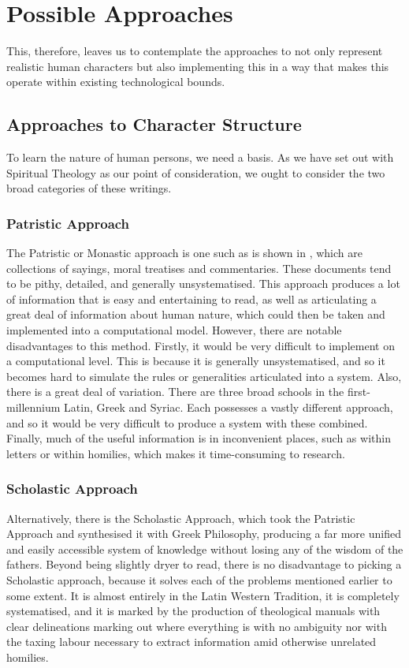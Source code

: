 \documentclass[11pt]{article}
\begin{document}
\section{Possible Approaches}
This, therefore, leaves us to contemplate the approaches to not only represent realistic human characters but also implementing this in a way that makes this operate within existing technological bounds.
\subsection{Approaches to Character Structure}
To learn the nature of human persons, we need a basis. As we have set out with Spiritual Theology as our point of consideration, we ought to consider the two broad categories of these writings.
\subsubsection{Patristic Approach}
The Patristic or Monastic approach is one such as is shown in \cite{1983philokalia}, which are collections of sayings, moral treatises and commentaries. These documents tend to be pithy, detailed, and generally unsystematised. This approach produces a lot of information that is easy and entertaining to read, as well as articulating a great deal of information about human nature, which could then be taken and implemented into a computational model. However, there are notable disadvantages to this method. Firstly, it would be very difficult to implement on a computational level. This is because it is generally unsystematised, and so it becomes hard to simulate the rules or generalities articulated into a system. Also, there is a great deal of variation. There are three broad schools in the first-millennium \: Latin, Greek and Syriac. Each possesses a vastly different approach, and so it would be very difficult to produce a system with these combined. Finally, much of the useful information is in inconvenient places, such as within letters or within homilies, which makes it time-consuming to research.
\subsubsection{Scholastic Approach} 
Alternatively, there is the Scholastic Approach, which took the Patristic Approach and synthesised it with Greek Philosophy, producing a far more unified and easily accessible system of knowledge without losing any of the wisdom of the fathers. Beyond being slightly dryer to read, there is no disadvantage to picking a Scholastic approach, because it solves each of the problems mentioned earlier to some extent. It is almost entirely in the Latin Western Tradition, it is completely systematised, and it is marked by the production of theological manuals with clear delineations marking out where everything is with no ambiguity nor with the taxing labour necessary to extract information amid otherwise unrelated homilies. 
\end{document}
